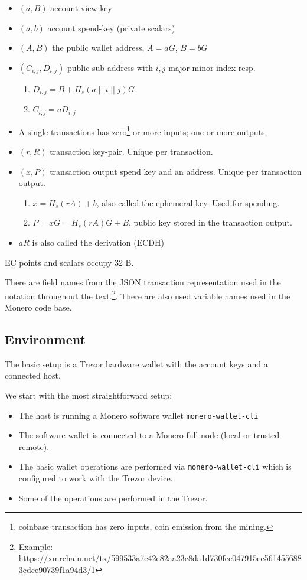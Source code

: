 \documentclass[]{article}
\begin{document}
\begin{itemize}
	\item $(a, B)$ account view-key
	\item $(a, b)$ account spend-key (private scalars)
	\item $(A, B)$ the public wallet address, $A=aG$, $B=bG$
	\item $(C_{i,j}, D_{i,j})$ public sub-address with $i, j$ major minor index resp.
	\begin{enumerate}
		\item $D_{i,j} = B + H_s(a \; || \; i \; || \; j)G$
		\item $C_{i,j} = aD_{i,j}$ 
	\end{enumerate}
	\item A single transactions has zero\footnote{coinbase transaction has zero inputs, coin emission from the mining.} or more inputs; one or more outputs.
	\item $(r, R)$ transaction key-pair. Unique per transaction. 
	\item $(x, P)$ transaction output spend key and an address. Unique per transaction output.
	\begin{enumerate}
		\item $x = H_s(rA) + b$, also called the ephemeral key. Used for spending.
		\item $P = xG = H_s(rA)G + B$, public key stored in the transaction output.
	\end{enumerate}
	\item $aR$ is also called the derivation (ECDH)
\end{itemize}

EC points and scalars occupy 32 B.

There are field names from the JSON transaction representation used in the notation throughout the text.\footnote{Example: \url{https://xmrchain.net/tx/599533a7e42e82aa23c8da1d730fec047915ee5614556883cdce90739f1a94d3/1}}. There are also used variable names used in the Monero code base.

\subsection{Environment}

The basic setup is a Trezor hardware wallet with the account keys and a connected host.

We start with the most straightforward setup:
\begin{itemize}
	\item The host is running a Monero software wallet \verb|monero-wallet-cli|
	
	\item  The software wallet is connected to a Monero full-node (local or trusted remote).
	
	\item The basic wallet operations are performed via \verb|monero-wallet-cli| which is configured to work with the Trezor device.
	
	\item Some of the operations are performed in the Trezor. 
\end{itemize}
\end{document}
